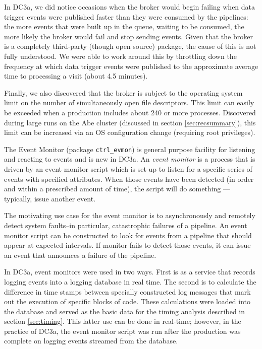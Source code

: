 \label{brokerprob} In DC3a, we did notice occasions when the
broker would begin failing when data trigger events were published
faster than they were consumed by the pipelines:  the more events that
were built up in the queue, waiting to be consumed, the more likely
the broker would fail and stop sending events.  Given that the broker
is a completely third-party (though open source) package, the cause of
this is not fully understood.  We were able to work around this by
throttling down the frequency at which data trigger events were
published to the approximate average time to processing a visit (about
4.5 minutes).  

Finally, we also discovered that the broker is subject to the
operating system limit on the number of simultaneously open file
descriptors.  This limit can easily be exceeded when a production
includes about 240 or more processes.  Discovered during large runs on
the Abe cluster (discussed in section \ref{sec:recsummary}), this
limit can be increased via an OS configuration change (requiring root
privileges).  

 \label{sec:evmon}

The Event Monitor (package {\tt ctrl\_evmon}) is general purpose
facility for listening and reacting to events and is new in DC3a.  An
{\it event monitor} is a process that is driven by an event monitor
script which is set up to listen for a specific series of events with
specified attributes.  When those events have been detected (in order
and within a prescribed amount of time), the script will do
something --- typically, issue another event.  

The motivating use case for the event monitor is to asynchronously and
remotely detect system faults--in particular, catastrophic failures of
a pipeline.  An event monitor script can be constructed to look for
events from a pipeline that should appear at expected intervals.  If
monitor fails to detect those events, it can issue an event that
announces a failure of the pipeline.

In DC3a, event monitors were used in two ways.  First is as a service
that records logging events into a logging database in real time.  The
second is to calculate the difference in time stamps between specially
constructed log messages that mark out the execution of specific
blocks of code.  These calculations were loaded into the database and
served as the basic data for the timing analysis described in
section \ref{sec:timing}.  This latter use can be done in real-time;
however, in the practice of DC3a, the event monitor script was run
after the production was complete on logging events streamed from the
database.  

